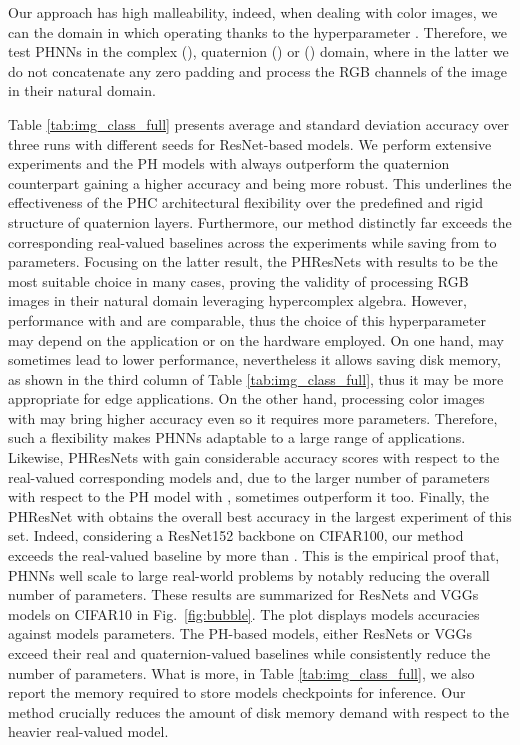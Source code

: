 \documentclass[lettersize,journal]{IEEEtran}
\begin{document}
Our approach has high malleability, indeed, when dealing with color images, we can the domain in which operating thanks to the hyperparameter . Therefore, we test PHNNs in the complex (), quaternion () or  () domain, where in the latter we do not concatenate any zero padding and process the RGB channels of the image in their natural domain.






Table \ref{tab:img_class_full} presents average and standard deviation accuracy over three runs with different seeds for ResNet-based models. We perform extensive experiments and the PH models with  always outperform the quaternion counterpart gaining a higher accuracy and being more robust. This underlines the effectiveness of the PHC architectural flexibility over the predefined and rigid structure of quaternion layers. Furthermore, our method distinctly far exceeds the corresponding real-valued baselines across the experiments while saving from  to  parameters. Focusing on the latter result, the PHResNets with  results to be the most suitable choice in many cases, proving the validity of processing RGB images in their natural domain leveraging hypercomplex algebra. However, performance with  and  are comparable, thus the choice of this hyperparameter may depend on the application or on the hardware employed. On one hand,  may sometimes lead to lower performance, nevertheless it allows saving disk memory, as shown in the third column of Table \ref{tab:img_class_full}, thus it may be more appropriate for edge applications. On the other hand, processing color images with  may bring higher accuracy even so it requires more parameters. Therefore, such a flexibility makes PHNNs adaptable to a large range of applications.
Likewise, PHResNets with  gain considerable accuracy scores with respect to the real-valued corresponding models and, due to the larger number of parameters with respect to the PH model with , sometimes outperform it too. Finally, the PHResNet with  obtains the overall best accuracy in the largest experiment of this set. Indeed, considering a ResNet152 backbone on CIFAR100, our method exceeds the real-valued baseline by more than . This is the empirical proof that, PHNNs well scale to large real-world problems by notably reducing the overall number of parameters. These results are summarized for ResNets and VGGs models on CIFAR10 in Fig.~\ref{fig:bubble}. The plot displays models accuracies against models parameters. The PH-based models, either ResNets or VGGs exceed their real and quaternion-valued baselines while consistently reduce the number of parameters. What is more, in Table \ref{tab:img_class_full}, we also report the memory required to store models checkpoints for inference. Our method crucially reduces the amount of disk memory demand with respect to the heavier real-valued model.
\end{document}
